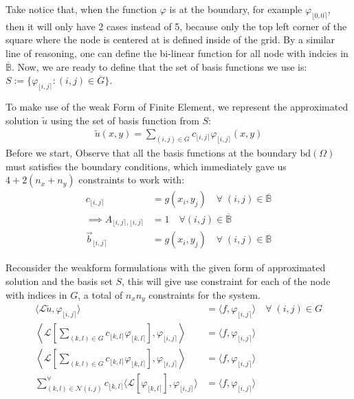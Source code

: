 \documentclass[]{article}
\begin{document}
    Take notice that, when the function $\varphi$ is at the boundary, for example $\varphi_{\lfloor 0, 0\rceil}$, then it will only have 2 cases instead of 5, because only the top left corner of the square where the node is centered at is defined inside of the grid. By a similar line of reasoning, one can define the bi-linear function for all node with indcies in $\overline{\mathbb{B}}$. Now, we are ready to define that the set of basis functions we use is: $S:= \{\varphi_{\lfloor i,j \rceil}: (i, j)\in \overline{G}\}$. 
    \par
    To make use of the weak Form of Finite Element, we represent the approximated solution $\tilde{u}$ using the set of basis function from $S$: 
    \begin{align*}\tag{3.5}\label{eqn:3.5}
        \tilde{u}(x,y) = 
        \sum_{(i, j)\in \overline{G}}^{}
        c_{\lfloor i,j \rceil}\varphi_{\lfloor i,j \rceil}(x, y)
    \end{align*}
    Before we start, Observe that all the basis functions at the boundary $\text{bd}(\Omega)$ must satisfies the boundary conditions, which immediately gave us $4 + 2(n_x + n_y)$ constraints to work with: 
    \begin{align*}\tag{3.6}\label{eqn:3.6}
        c_{\lfloor i, j\rceil} &= g(x_i, y_j) \quad \forall \; (i, j) \in \overline{\mathbb{B}}
        \\
        \implies
        A_{\lfloor i, j\rceil, \lfloor i, j\rceil} &= 
        1 \quad \forall (i, j) \in \overline{\mathbb{B}}
        \\
        \vec{b}_{\lfloor i,j \rceil} &= g(x_i, y_j)  
        \quad \forall \; (i, j) \in \overline{\mathbb{B}}
    \end{align*}
    \par
    Reconsider the weakform formulations with the given form of approximated solution and the basis set $S$, this will give use constraint for each of the node with indices in $G$, a total of $n_xn_y$ constraints for the system. 
    \begin{align*}\tag{3.7}\label{eqn:3.7}
        \langle \mathcal{L}\tilde{u}, \varphi_{\lfloor i,j \rceil}\rangle &= \langle f, \varphi_{\lfloor i,j \rceil}\rangle \quad \forall \; (i, j) \in G
        \\
        \left\langle 
        \mathcal{L}\left[
            \sum_{(k, l)\in G}^{}
            c_{\lfloor k, l\rceil}\varphi_{
                \lfloor k, l\rceil
            }
            \right], 
            \varphi_{\lfloor i,j \rceil}\right\rangle 
            &= \langle f, \varphi_{\lfloor i,j \rceil}
        \rangle
        \\
        \left\langle 
        \mathcal{L}\left[
            \sum_{(k, l)\in G}^{}
            c_{\lfloor k, l\rceil}\varphi_{
                \lfloor k, l\rceil
            }
            \right], 
            \varphi_{\lfloor i,j \rceil}\right\rangle 
            &= \langle f, \varphi_{\lfloor i,j \rceil}
        \rangle
        \\
        \sum_{(k, l)\in\mathcal{N}(i, j)}^{\forall}c_{\lfloor k, l\rceil}
        \langle \mathcal{L}[\varphi_{\lfloor k,l \rceil}], \varphi_{\lfloor i, j \rceil}\rangle
        &= \langle f, \varphi_{\lfloor i, j \rceil}\rangle
    \end{align*}
\end{document}

